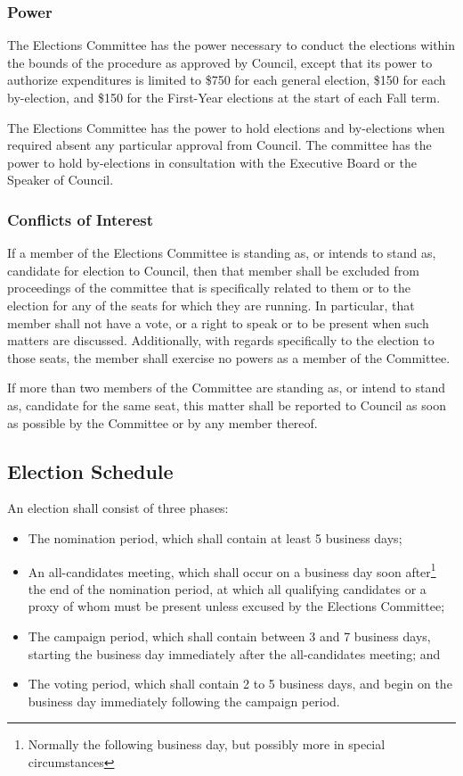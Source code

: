 \subsubsection{Power}
The Elections Committee has the power necessary to conduct the elections within the bounds of the procedure as approved by Council, except that its power to authorize expenditures is limited to \$750 for each general election, \$150 for each by-election, and \$150 for the First-Year elections at the start of each Fall term.

The Elections Committee has the power to hold elections and by-elections when required absent any particular approval from Council.
The committee has the power to hold by-elections in consultation with the Executive Board or the Speaker of Council.

\subsubsection{Conflicts of Interest}
If a member of the Elections Committee is standing as, or intends to stand as, candidate for election to Council, then that member shall be excluded from proceedings of the committee that is specifically related to them or to the election for any of the seats for which they are running.
In particular, that member shall not have a vote, or a right to speak or to be present when such matters are discussed.
Additionally, with regards specifically to the election to those seats, the member shall exercise no powers as a member of the Committee.

If more than two members of the Committee are standing as, or intend to stand as, candidate for the same seat, this matter shall be reported to Council as soon as possible by the Committee or by any member thereof.

\subsection{Election Schedule}
An election shall consist of three phases:

\begin{itemize}
	\item The nomination period, which shall contain at least 5 business days;
	\item An all-candidates meeting, which shall occur on a business day soon after\footnote{Normally the following business day, but possibly more in special circumstances} the end of the nomination period, at which all qualifying candidates or a proxy of whom must be present unless excused by the Elections Committee;
	\item The campaign period, which shall contain between 3 and 7 business days, starting the business day immediately after the all-candidates meeting; and
	\item The voting period, which shall contain 2 to 5 business days, and begin on the business day immediately following the campaign period.
\end{itemize}


